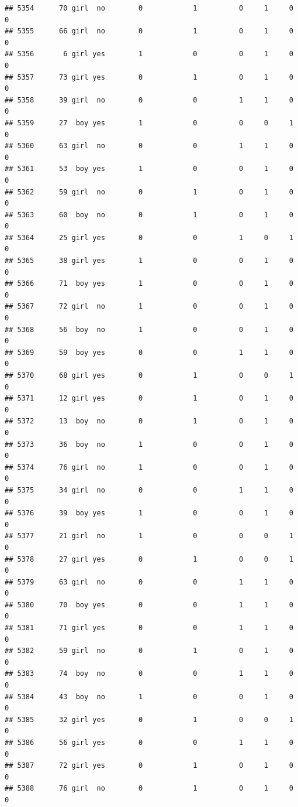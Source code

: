 \documentclass[man]{apa6}
\begin{document}
\begin{verbatim}
## 5354      70 girl  no        0            1          0     1     0     0
## 5355      66 girl  no        0            1          0     1     0     0
## 5356       6 girl yes        1            0          0     1     0     0
## 5357      73 girl yes        0            1          0     1     0     0
## 5358      39 girl  no        0            0          1     1     0     0
## 5359      27  boy yes        1            0          0     0     1     0
## 5360      63 girl  no        0            0          1     1     0     0
## 5361      53  boy yes        1            0          0     1     0     0
## 5362      59 girl  no        0            1          0     1     0     0
## 5363      60  boy  no        0            1          0     1     0     0
## 5364      25 girl yes        0            0          1     0     1     0
## 5365      38 girl yes        1            0          0     1     0     0
## 5366      71  boy yes        1            0          0     1     0     0
## 5367      72 girl  no        1            0          0     1     0     0
## 5368      56  boy  no        1            0          0     1     0     0
## 5369      59  boy yes        0            0          1     1     0     0
## 5370      68 girl yes        0            1          0     0     1     0
## 5371      12 girl yes        0            1          0     1     0     0
## 5372      13  boy  no        0            1          0     1     0     0
## 5373      36  boy  no        1            0          0     1     0     0
## 5374      76 girl  no        1            0          0     1     0     0
## 5375      34 girl  no        0            0          1     1     0     0
## 5376      39  boy yes        1            0          0     1     0     0
## 5377      21 girl  no        1            0          0     0     1     0
## 5378      27 girl yes        0            1          0     0     1     0
## 5379      63 girl  no        0            0          1     1     0     0
## 5380      70  boy yes        0            0          1     1     0     0
## 5381      71 girl yes        0            0          1     1     0     0
## 5382      59 girl  no        0            1          0     1     0     0
## 5383      74  boy  no        0            0          1     1     0     0
## 5384      43  boy  no        1            0          0     1     0     0
## 5385      32 girl yes        0            1          0     0     1     0
## 5386      56 girl yes        0            0          1     1     0     0
## 5387      72 girl yes        0            1          0     1     0     0
## 5388      76 girl  no        0            1          0     1     0     0

\end{verbatim}
\end{document}
